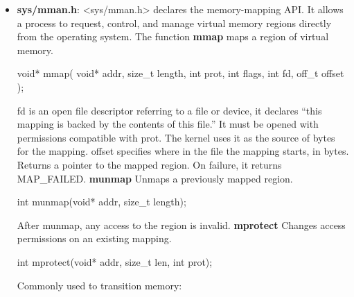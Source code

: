 \documentclass{report}
\begin{document}
\begin{itemize}
\begin{cppcode}
                int value;
                // Cast to a function pointer, then call, store returned value from call in value
                value = ((int(*)(void))prog)();
            \end{cppcode}
            \bigbreak \noindent 
            If we run this code, we will get a seg fault. This is because our memory block is only read/write, we need a way to mark the memory as executable. We can do this by using sys/mman.h to allocate memory through the operating system, and errno to check for errors.
        \item \textbf{sys/mman.h}:  <sys/mman.h> declares the memory-mapping API. It allows a process to request, control, and manage virtual memory regions directly from the operating system.
            \bigbreak \noindent 
            The function \textbf{mmap} maps a region of virtual memory.
            \bigbreak \noindent 
            \begin{cppcode}
                void* mmap(
                    void* addr,
                    size_t length,
                    int prot,
                    int flags,
                    int fd,
                    off_t offset
                );
            \end{cppcode}
            \bigbreak \noindent 
            fd is an open file descriptor referring to a file or device, it declares “this mapping is backed by the contents of this file.” It must be opened with permissions compatible with prot. The kernel uses it as the source of bytes for the mapping. offset specifies where in the file the mapping starts, in bytes.
            \bigbreak \noindent 
            Returns a pointer to the mapped region. On failure, it returns MAP\_FAILED.
            \bigbreak \noindent 
            \textbf{munmap} Unmaps a previously mapped region.
            \bigbreak \noindent 
            \begin{cppcode}
                int munmap(void* addr, size_t length);
            \end{cppcode}
            \bigbreak \noindent 
            After munmap, any access to the region is invalid.
            \bigbreak \noindent 
            \textbf{mprotect} Changes access permissions on an existing mapping.
            \bigbreak \noindent 
            \begin{cppcode}
                int mprotect(void* addr, size_t len, int prot);
            \end{cppcode}
            \bigbreak \noindent 
            Commonly used to transition memory:

\end{itemize}
\end{document}
